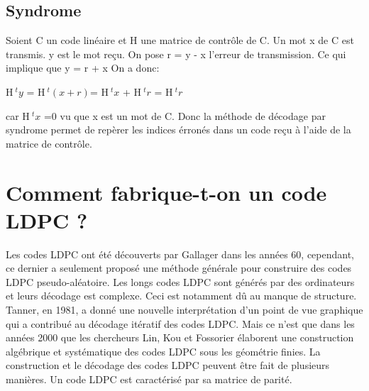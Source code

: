 \documentclass[french,nochapter,11pt]{rapportUB}
\begin{document}
\subsection{Syndrome}
Soient C un code linéaire et H une matrice de contrôle de C. Un mot x de C est transmis. y est le mot reçu. \newline
On pose r = y - x l'erreur de transmission. Ce qui implique que y = r + x \newline
On a donc:
\begin{tabbing}
  \hspace{5cm} H$~^ty$ = H$~^t(x + r)$= H$~^tx$ + H$~^tr$  = H$~^tr$ 
\end{tabbing}
car H$~^tx$ =0 vu que x est un mot de C.
Donc la méthode de décodage par syndrome permet de repèrer les indices érronés dans un code reçu à l'aide de la matrice de contrôle.
\clearpage

\section{Comment fabrique-t-on un code LDPC ?}
\label{sec:fabrication}
Les codes LDPC ont été découverts par Gallager dans les années 60, cependant, ce dernier a seulement proposé une méthode générale pour 
construire des codes LDPC pseudo-aléatoire.\newline
Les longs codes LDPC sont générés par des ordinateurs et leurs décodage est complexe. Ceci est notamment dû au manque de structure. Tanner, en 1981, a donné 
une nouvelle interprétation d'un point de vue graphique qui a contribué au décodage itératif des codes LDPC.\vspace{0.4cm}\newline
Mais ce n'est que dans les années 2000 que les chercheurs Lin, Kou et Fossorier élaborent une construction algébrique et systématique des codes LDPC
sous les géométrie finies. La construction et le décodage des codes LDPC peuvent être fait de plusieurs manières. Un code LDPC est caractérisé par sa matrice de parité.\vspace{0.4cm}\newline
\end{document}
